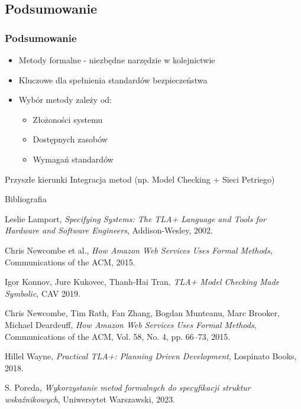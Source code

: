 \documentclass{beamer}
\begin{document}
\subsection{Podsumowanie}
\begin{frame}
\frametitle{Podsumowanie}
\begin{itemize}
\item Metody formalne - niezbędne narzędzie w kolejnictwie
\item Kluczowe dla spełnienia standardów bezpieczeństwa
\item Wybór metody zależy od:
\begin{itemize}
\item Złożoności systemu
\item Dostępnych zasobów
\item Wymagań standardów
\end{itemize}
\end{itemize}

\begin{block}{Przyszłe kierunki}
Integracja metod (np. Model Checking + Sieci Petriego)
\end{block}
\end{frame}

\begin{frame}{Bibliografia}
  \scriptsize
  \begin{thebibliography}{9}
    Leslie Lamport, \emph{Specifying Systems: The TLA+ Language and Tools for Hardware and Software Engineers}, Addison-Wesley, 2002.
  
    Chris Newcombe et al., \emph{How Amazon Web Services Uses Formal Methods}, Communications of the ACM, 2015.
  
    Igor Konnov, Jure Kukovec, Thanh-Hai Tran, \emph{TLA+ Model Checking Made Symbolic}, CAV 2019.
    
    Chris Newcombe, Tim Rath, Fan Zhang, Bogdan Munteanu, Marc Brooker, Michael Deardeuff, \emph{How Amazon Web Services Uses Formal Methods}, Communications of the ACM, Vol. 58, No. 4, pp. 66--73, 2015.

    Hillel Wayne, \emph{Practical TLA+: Planning Driven Development}, Lospinato Books, 2018.
    
    S. Poreda,
    \textit{Wykorzystanie metod formalnych do specyfikacji struktur wskaźnikowych},
    Uniwersytet Warszawski, 2023.
  \end{thebibliography}
\end{frame}
\end{document}
